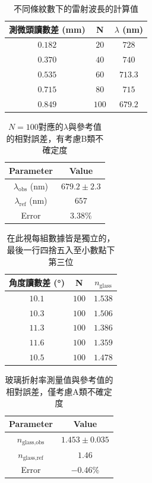 \begin{table}[htb!]
\centering
\caption{不同條紋數下的雷射波長的計算值}
\begin{tabular}{ccc}
\toprule
測微頭讀數差 (\unit{\mm}) & N & $\lambda$ (\unit{\nm}) \\
\midrule
$0.182$ & $20$ & $728$ \\
$0.370$ & $40$ & $740$ \\
$0.535$ & $60$ & $713.3$ \\
$0.715$ & $80$ & $715$ \\
$0.849$ & $100$ & $679.2$ \\
\bottomrule
\end{tabular}
\end{table}
\begin{table}[htb!]
\centering
\caption{$N=100$對應的$\lambda$與參考值的相對誤差，有考慮B類不確定度}
\begin{tabular}{cc}
\toprule
Parameter & Value \\
\midrule
$\lambda_{\text{obs}}$ (\unit{\nm}) & $679.2 \pm 2.3$ \\
$\lambda_{\text{ref}}$ (\unit{\nm}) & $657$ \\
Error & $3.38\%$ \\
\bottomrule
\end{tabular}
\end{table}
\begin{table}[htb!]
\centering
\caption{在此視每組數據皆是獨立的，最後一行四捨五入至小數點下第三位}
\begin{tabular}{ccc}
\toprule
角度讀數差 (\unit{\degree}) & N & $n_{\text{glass}}$ \\
\midrule
$10.1$ & $100$ & $1.538$ \\
$10.3$ & $100$ & $1.506$ \\
$11.3$ & $100$ & $1.386$ \\
$11.6$ & $100$ & $1.359$ \\
$10.5$ & $100$ & $1.478$ \\
\bottomrule
\end{tabular}
\end{table}
\begin{table}[htb!]
\centering
\caption{玻璃折射率測量值與參考值的相對誤差，僅考慮A類不確定度}
\begin{tabular}{cc}
\toprule
Parameter & Value \\
\midrule
$n_{\text{glass,obs}}$ & $1.453 \pm 0.035$ \\
$n_{\text{glass,ref}}$ & $1.46$ \\
Error & $-0.46\%$ \\
\bottomrule
\end{tabular}
\end{table}
